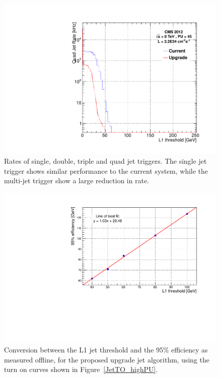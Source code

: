 \begin{figure}[t!]
\begin{center}
   \includegraphics[scale=0.3]{Figures/l1jets/quadJetRates_2e34.pdf}
\caption{Rates of single, double, triple and quad jet triggers. The single jet trigger shows similar performance to the current system, while the multi-jet trigger show a large reduction in rate. }
\label{JetRate_L1}
\end{center}
\end{figure}

\begin{figure}[t!]
\begin{center}
  \includegraphics[scale=0.37]{Figures/l1jets/makePlot/jet_95threshold_conv.pdf}
\caption{Conversion between the \ac{L1} jet threshold and the 95\% efficiency as measured offline, for the proposed upgrade jet algorithm, using the turn on curves shown in Figure~\ref{JetTO_highPU}. }
\label{JetRate_conv}
\end{center}
\end{figure}

